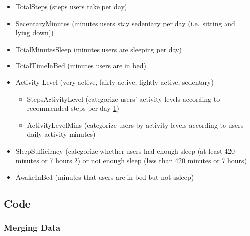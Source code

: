 \documentclass[
]{article}
\providecommand{\tightlist}{%
  \setlength{\itemsep}{0pt}\setlength{\parskip}{0pt}}
\begin{document}
\begin{itemize}
\tightlist
\item
  TotalSteps (steps users take per day)
\item
  SedentaryMinutes (minutes users stay sedentary per day (i.e.~sitting
  and lying down))
\item
  TotalMinutesSleep (minutes users are sleeping per day)
\item
  TotalTimeInBed (minutes users are in bed)
\item
  Activity Level (very active, fairly active, lightly active, sedentary)

  \begin{itemize}
  \tightlist
  \item
    StepsActivityLevel (categorize users' activity levels according to
    recommended steps per day
    \href{https://www.medicinenet.com/how_many_steps_a_day_is_considered_active/article.htm}{1})
  \item
    ActivityLevelMins (categorize users by activity levels according to
    users daily activity minutes)
  \end{itemize}
\item
  SleepSufficiency (categorize whether users had enough sleep (at least
  420 minutes or 7 hours
  \href{https://www.sleepfoundation.org/sleep-hygiene/what-is-healthy-sleep}{2})
  or not enough sleep (less than 420 minutes or 7 hours)
\item
  AwakeInBed (minutes that users are in bed but not asleep)
\end{itemize}

\hypertarget{code-1}{%
\subsection{Code}\label{code-1}}

\hypertarget{merging-data}{%
\subsubsection{Merging Data}\label{merging-data}}
\end{document}
